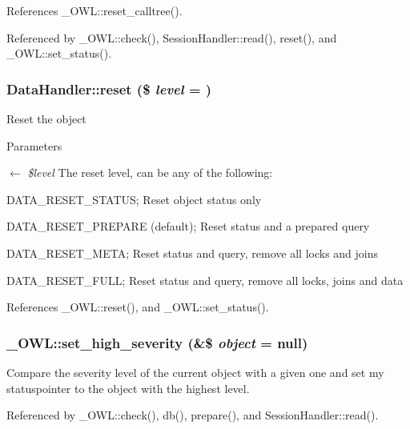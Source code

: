References \_\-OWL::reset\_\-calltree().



Referenced by \_\-OWL::check(), SessionHandler::read(), reset(), and \_\-OWL::set\_\-status().

\subsubsection[{reset}]{\setlength{\rightskip}{0pt plus 5cm}DataHandler::reset (\$ {\em level} = {})}\label{classDataHandler_ab89e1aaad9cd0a37f1c7f13c1d9c0d57}
Reset the object 
\begin{DoxyParams}{Parameters}
\item[\mbox{$\leftarrow$} {\em \$level}]The reset level, can be any of the following:
\begin{DoxyItemize}
\item DATA\_\-RESET\_\-STATUS; Reset object status only
\item DATA\_\-RESET\_\-PREPARE (default); Reset status and a prepared query
\item DATA\_\-RESET\_\-META; Reset status and query, remove all locks and joins
\item DATA\_\-RESET\_\-FULL; Reset status and query, remove all locks, joins and data 
\end{DoxyItemize}\end{DoxyParams}


References \_\-OWL::reset(), and \_\-OWL::set\_\-status().

\subsubsection[{set\_\-high\_\-severity}]{\setlength{\rightskip}{0pt plus 5cm}\_\-OWL::set\_\-high\_\-severity (\&\$ {\em object} = {\ttfamily null})}\label{class__OWL_a576829692a3b66e3d518853bf43abae3}
Compare the severity level of the current object with a given one and set my statuspointer to the object with the highest level. 

Referenced by \_\-OWL::check(), db(), prepare(), and SessionHandler::read().

